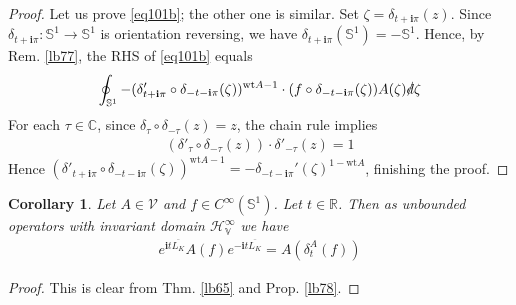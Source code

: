 \documentclass[12pt,b5paper,notitlepage]{article}
\theoremstyle{definition}
\theoremstyle{plain}
\newtheorem{co}[df]{Corollary}
\newcommand{\mc}{\mathcal}
\newcommand{\ovl}{\overline}
\newcommand{\im}{\mathbf{i}}
\newcommand{\Vbb}{\mathbb V}
\newcommand{\Cbb}{\mathbb C}
\newcommand{\Rbb}{\mathbb R}
\newcommand{\wt}{\mathrm{wt}}
\newcommand{\Sbb}{{\mathbb S}}
\newcommand{\ointn}{\oint\nolimits}
\newcommand{\sd}{\slashed{d}}
\newcommand{\MV}{\mathcal V}
\numberwithin{equation}{section}
\begin{document}
\begin{proof}
Let us prove \eqref{eq101b}; the other one is similar. Set  $\zeta=\delta_{t+\im\pi}(z)$. Since $\delta_{t+\im\pi}:\Sbb^1\rightarrow\Sbb^1$ is orientation reversing, we have $\delta_{t+\im\pi}(\Sbb^1)=-\Sbb^1$. Hence, by Rem. \ref{lb77}, the RHS of \eqref{eq101b} equals
\begin{align*}
\ointn_{\Sbb^1}-(\delta'_{t+\im\pi}\circ\delta_{-t-\im\pi}(\zeta))^{\wt A-1}\cdot (f\circ\delta_{-t-\im\pi}(\zeta))A(\zeta)\sd\zeta
\end{align*}
For each $\tau\in\Cbb$, since $\delta_\tau\circ\delta_{-\tau}(z)=z$, the chain rule implies
\begin{align*}
(\delta'_\tau\circ\delta_{-\tau}(z))\cdot\delta'_{-\tau}(z)=1
\end{align*}
Hence $(\delta'_{t+\im\pi}\circ\delta_{-t-\im\pi}(\zeta))^{\wt A-1}=-\delta_{-t-\im\pi}'(\zeta)^{1-\wt A}$, finishing the proof.
\end{proof}









\begin{co}\label{lbb17}
Let $A\in\MV$ and $f\in C^\infty(\Sbb^1)$. Let $t\in\Rbb$. Then as unbounded operators with invariant domain $\mc H^\infty_\Vbb$ we have
\begin{align}
e^{\im t\ovl{L_K}}A(f)e^{-\im t{\ovl{L_K}}}=A(\delta^A_t(f))
\end{align}
\end{co}

\begin{proof}
This is clear from Thm. \ref{lb65} and Prop. \ref{lb78}.
\end{proof}










\subsection{}
\end{document}
